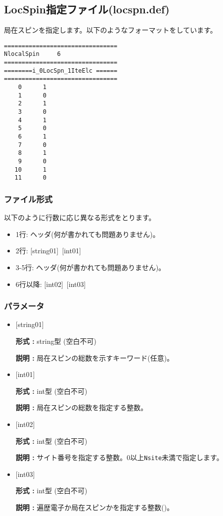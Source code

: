 \newpage
\subsection{LocSpin指定ファイル(locspn.def)}
\label{Subsec:locspn}
局在スピンを指定します。以下のようなフォーマットをしています。\\
\begin{minipage}{10cm}
\begin{screen}
\begin{verbatim}
================================ 
NlocalSpin     6  
================================ 
========i_0LocSpn_1IteElc ====== 
================================ 
    0      1
    1      0
    2      1
    3      0
    4      1
    5      0
    6      1
    7      0
    8      1
    9      0
   10      1
   11      0
\end{verbatim}
\end{screen}
\end{minipage}


\subsubsection{ファイル形式}
以下のように行数に応じ異なる形式をとります。
 \begin{itemize}
   \item  1行:  ヘッダ(何が書かれても問題ありません)。
   \item  2行:   [string01]~[int01]
   \item  3-5行:  ヘッダ(何が書かれても問題ありません)。
   \item  6行以降:  [int02]~[int03]
  \end{itemize}
 \subsubsection{パラメータ}
 \begin{itemize}

 \item  $[$string01$]$

 {\bf 形式 :} string型 (空白不可)

{\bf 説明 :} 局在スピンの総数を示すキーワード(任意)。


  \item  $[$int01$]$

 {\bf 形式 :} int型 (空白不可)

{\bf 説明 :} 局在スピンの総数を指定する整数。

 
  \item  $[$int02$]$

 {\bf 形式 :} int型 (空白不可)

{\bf 説明 :} サイト番号を指定する整数。0以上\verb|Nsite|{未満}で指定します。

 
  \item  $[$int03$]$

 {\bf 形式 :} int型 (空白不可)

{\bf 説明 :} 遍歴電子か局在スピンかを指定する整数()。\\
 \end{itemize}

